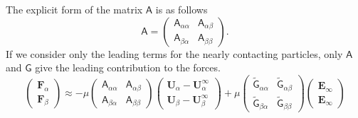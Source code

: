 \documentclass[12pt]{article}
\newcommand{\tens}[1]{\bm{\mathsf{#1}}}
\begin{document}
The explicit form of the matrix $\tens{A}$ 
is as follows
\begin{equation}
 \tens{A}
 =
\begin{pmatrix}
  \tens{A}_{\alpha\alpha} & \tens{A}_{\alpha\beta} \\
  \tens{A}_{\beta\alpha} & \tens{A}_{\beta\beta} 
\end{pmatrix}.
\end{equation}
%
If we consider only the leading terms for the nearly contacting particles,
only $\tens{A}$ and $\tens{G}$ give the leading contribution to the forces.
\begin{equation}
 \begin{pmatrix}
  \bm{F}_{\alpha} \\
  \bm{F}_{\beta} 
 \end{pmatrix}
\approx
- \mu
\begin{pmatrix}
\tens{A}_{\alpha\alpha} &
\tens{A}_{\alpha\beta}  \\
\tens{A}_{\beta\alpha}  &
\tens{A}_{\beta\beta}  
\end{pmatrix}
 \begin{pmatrix}
  \bm{U}_{\alpha} -  \bm{U}_{\alpha}^{\infty}\\
  \bm{U}_{\beta} -  \bm{U}_{\beta}^{\infty}
 \end{pmatrix}
 + \mu
\begin{pmatrix}
\tilde{\tens{G}}_{\alpha\alpha} &
\tilde{\tens{G}}_{\alpha\beta}  \\
\tilde{\tens{G}}_{\beta\alpha}  &
\tilde{\tens{G}}_{\beta\beta}  
\end{pmatrix}
 \begin{pmatrix}
\bm{E}_{\infty} \\ \bm{E}_{\infty}
\end{pmatrix}
\end{equation}
\end{document}

